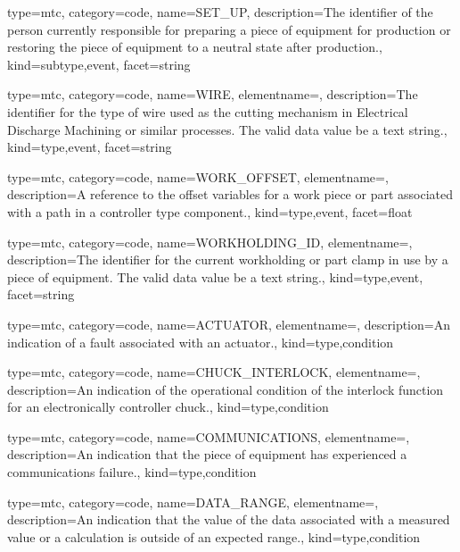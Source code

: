 {
  type=mtc,
  category=code,
  name={SET\_UP},
  description={The identifier of the person currently responsible for preparing a piece of equipment for production or restoring the piece of equipment to a neutral state after production.},
  kind={subtype,event},
  facet={\gls{string}}
}


{
  type=mtc,
  category=code,
  name={WIRE},
  elementname=,
  description={The identifier for the type of wire used as the cutting mechanism in Electrical Discharge Machining or similar processes. \newline The \gls{valid data value} \must be a text string.},
  kind={type,event},
  facet={\gls{string}}
}


{
  type=mtc,
  category=code,
  name={WORK\_OFFSET},
  elementname=,
  description={A reference to the offset variables for a work piece or part associated with a \gls{path} in a \gls{controller} type component.},
  kind={type,event},
  facet={\gls{float}}
}


{
  type=mtc,
  category=code,
  name={WORKHOLDING\_ID},
  elementname=,
  description={The identifier for the current workholding or part clamp in use by a piece of equipment. \newline The \gls{valid data value} \must be a text string.},
  kind={type,event},
  facet={\gls{string}}
}


{
  type=mtc,
  category=code,
  name={ACTUATOR},
  elementname=,
  description={An indication of a fault associated with an actuator.},
  kind={type,condition}
}


{
  type=mtc,
  category=code,
  name={CHUCK\_INTERLOCK},
  elementname=,
  description={An indication of the operational condition of the interlock function for an electronically controller chuck.},
  kind={type,condition}
}


{
  type=mtc,
  category=code,
  name={COMMUNICATIONS},
  elementname=,
  description={An indication that the piece of equipment has experienced a communications failure.},
  kind={type,condition}
}


{
  type=mtc,
  category=code,
  name={DATA\_RANGE},
  elementname=,
  description={An indication that the value of the data associated with a measured value or a calculation is outside of an expected range.},
  kind={type,condition}
}


